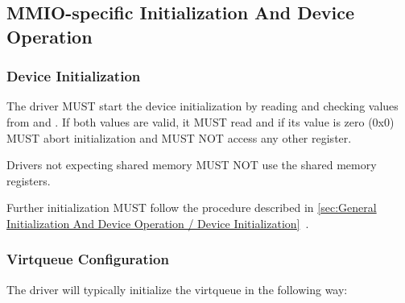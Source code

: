 \subsection{MMIO-specific Initialization And Device Operation}\label{sec:Virtio Transport Options / Virtio Over MMIO / MMIO-specific Initialization And Device Operation}

\subsubsection{Device Initialization}\label{sec:Virtio Transport Options / Virtio Over MMIO / MMIO-specific Initialization And Device Operation / Device Initialization}


The driver MUST start the device initialization by reading and
checking values from  and .
If both values are valid, it MUST read 
and if its value is zero (0x0) MUST abort initialization and
MUST NOT access any other register.

Drivers not expecting shared memory MUST NOT use the shared
memory registers.

Further initialization MUST follow the procedure described in
\ref{sec:General Initialization And Device Operation / Device Initialization}~.

\subsubsection{Virtqueue Configuration}\label{sec:Virtio Transport Options / Virtio Over MMIO / MMIO-specific Initialization And Device Operation / Virtqueue Configuration}

The driver will typically initialize the virtqueue in the following way:

